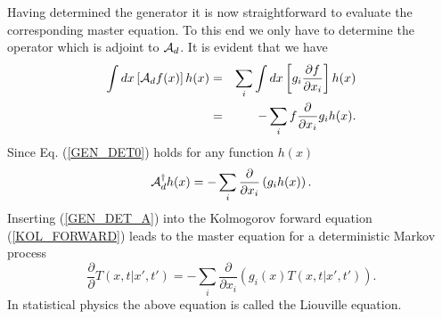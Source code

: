 Having determined the generator it is now straightforward to 
evaluate the corresponding master equation. To this end we only 
have to determine the operator which is adjoint to
${\cal{A}}_d$. It is evident that we have
\begin{eqnarray}
\label{GEN_DET0}
\int dx \left[{\cal{A}}_d f(x) \right]h(x) &=&
          \sum_i \int dx \left[g_i 
           \frac{\partial f}{\partial x_i} \right] h(x) \nonumber \\
     & = & -\sum_i f \frac{\partial}{\partial x_i} g_i h(x).      
\end{eqnarray}
Since Eq. (\ref{GEN_DET0}) holds for any function $h(x)$
\begin{equation}
\label{GEN_DET_A}
{\cal{A}}_d^{\dagger} h(x) = -\sum_i \frac{\partial}{\partial x_i}
    \left(g_i h(x) \right).
\end{equation}
Inserting (\ref{GEN_DET_A}) into the Kolmogorov forward equation
(\ref{KOL_FORWARD}) 
leads to the master equation for a deterministic Markov process
\begin{equation}
\frac{\partial}{\partial} T(x,t|x',t') =
 - \sum_i \frac{\partial}{\partial x_i}
     \left(g_i(x)T(x,t|x',t')  \right).
\end{equation}
In statistical physics the above equation is called the Liouville 
equation.

